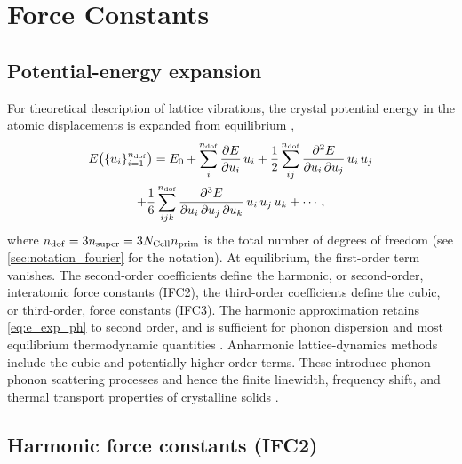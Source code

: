 \section{Force Constants}
\label{sec:fd}

\subsection{Potential-energy expansion}

For theoretical description of lattice vibrations,  the crystal potential energy
in the atomic displacements is expanded from equilibrium
\cite{born_dynamical_1996, maradudin_theory_1963},
\begin{multline}\label{eq:e_exp_ph}
    E\bigl(\{u_i\}_{i=1}^{n_{\mathrm{dof}}}\bigr)
    = E_0 +
      \sum_{i}^{n_{\mathrm{dof}}} \frac{\partial E}{\partial u_i}\, u_i +
      \frac{1}{2}\sum_{ij}^{n_{\mathrm{dof}}}
        \frac{\partial^2 E}{\partial u_i\,\partial u_j}\, u_i\, u_j \\
    + \frac{1}{6}\sum_{ijk}^{n_{\mathrm{dof}}}
        \frac{\partial^3 E}{\partial u_i\,\partial u_j\,\partial u_k}\,
        u_i\, u_j\, u_k
    + \cdots,
\end{multline}
where $n_{\mathrm{dof}} = 3n_{\mathrm{super}} = 3N_{\mathrm{Cell}}n_{\mathrm{prim}}$ is the total number of
degrees of freedom (see \cref{sec:notation_fourier} for the notation).
At equilibrium, the first-order term vanishes.  The
second-order coefficients define the harmonic, or second-order,
interatomic force constants (IFC2), the third-order coefficients
define the cubic, or third-order, force constants (IFC3).
The harmonic approximation retains
\cref{eq:e_exp_ph} to second order, and is sufficient for phonon
dispersion and most equilibrium thermodynamic quantities
\cite{dove_introduction_1993, wallace_thermodynamics_1998}.
Anharmonic lattice-dynamics methods include the cubic and potentially higher-order terms.
These introduce phonon--phonon scattering processes and hence the finite linewidth,
frequency shift, and thermal transport properties of crystalline solids
\cite{ziman_electrons_2001, srivastava_physics_2019}.

\subsection{Harmonic force constants (IFC2)}
\label{sub:fc2}

